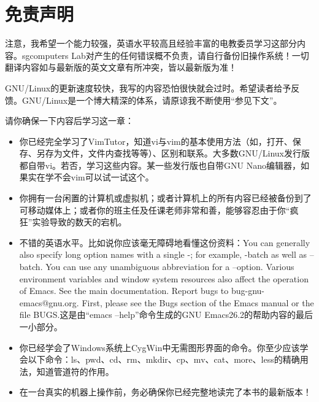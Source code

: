 \documentclass{book}
\begin{document}
\section{免责声明}
{\color{red} {注意，我希望一个能力较强，英语水平较高且经验丰富的电教委员学习这部分内容。sgcomputers Lab对产生的任何错误概不负责，请自行备份旧操作系统！一切翻译内容如与最新版的英文文章有所冲突，皆以最新版为准！}}\par
GNU/Linux的更新速度较快，我写的内容恐怕很快就会过时。希望读者给予反馈。GNU/Linux是一个博大精深的体系，请原谅我不断使用“参见下文”。\par
请你确保一下内容后学习这一章：
\begin{itemize}
	\item 你已经完全学习了VimTutor，知道vi与vim的基本使用方法（如，打开、保存、另存为文件，文件内查找等等）、区别和联系。大多数GNU/Linux发行版都自带vi。若否，学习这些内容。某一些发行版也自带GNU Nano编辑器，如果实在学不会vim可以试一试这个。
	\item 你拥有一台闲置的计算机或虚拟机；或者计算机上的所有内容已经被备份到了可移动媒体上；或者你的班主任及任课老师非常和善，能够容忍由于你“疯狂”实验导致的数天的宕机。
	\item 不错的英语水平。比如说你应该毫无障碍地看懂这份资料：You can generally also specify long option names with a single -; for example, -batch as well as --batch.  You can use any unambiguous abbreviation for a --option. Various environment variables and window system resources also affect the operation of Emacs.  See the main documentation. Report bugs to bug-gnu-emacs@gnu.org.  First, please see the Bugs section of the Emacs manual or the file BUGS.这是由“emacs --help”命令生成的GNU Emacs26.2的帮助内容的最后一小部分。
	\item 你已经学会了Windows系统上CygWin中无需图形界面的命令。你至少应该学会以下命令：ls、pwd、cd、rm、mkdir、cp、mv、cat、more、less的精确用法，知道管道符的作用。
	\item 在一台真实的机器上操作前，务必确保你已经完整地读完了本书的最新版本！
\end{itemize}
\end{document}
